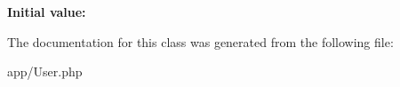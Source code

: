 {\bfseries Initial value\+:}
\begin{DoxyCode}{0}
\DoxyCodeLine{= [}
\DoxyCodeLine{        \textcolor{stringliteral}{'password'}, \textcolor{stringliteral}{'remember\_token'},}
\DoxyCodeLine{    ]}

\end{DoxyCode}


The documentation for this class was generated from the following file\+:\begin{DoxyCompactItemize}
\item 
app/User.\+php\end{DoxyCompactItemize}
